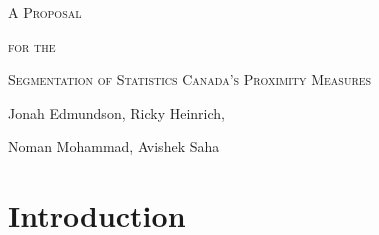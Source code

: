 \documentclass[11pt, a4paper]{article}
\begin{document}
\begin{center}
\Large{\textsc{A Proposal}}
\par
\small{\textsc{for the}}
\par
\Large{\textsc{Segmentation of Statistics Canada’s Proximity Measures}}
\par
\vspace{1.5pc}
\par
\small
Jonah Edmundson, Ricky Heinrich, \par Noman Mohammad, Avishek Saha
\end{center}
\vspace{2pc} %
\normalsize



\section*{Introduction}
\end{document}
